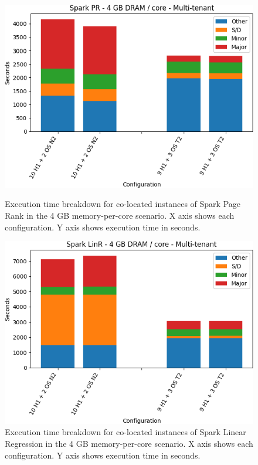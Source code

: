 \begin{figure}[thbp]
\centering
    \includegraphics[width=\linewidth]{./fig/pr32.png}
    \caption{Execution time breakdown for co-located instances of Spark
    Page Rank in the 4 GB memory-per-core scenario. X axis shows each configuration.
        Y axis shows execution time in seconds.}
    \label{fig:pr32}
        \includegraphics[width=\linewidth]{./fig/linr32.png}
    \caption{Execution time breakdown for co-located instances of Spark
    Linear Regression in the 4 GB memory-per-core scenario. X axis shows each configuration.
        Y axis shows execution time in seconds.}
    \label{fig:linr32}
\end{figure}


